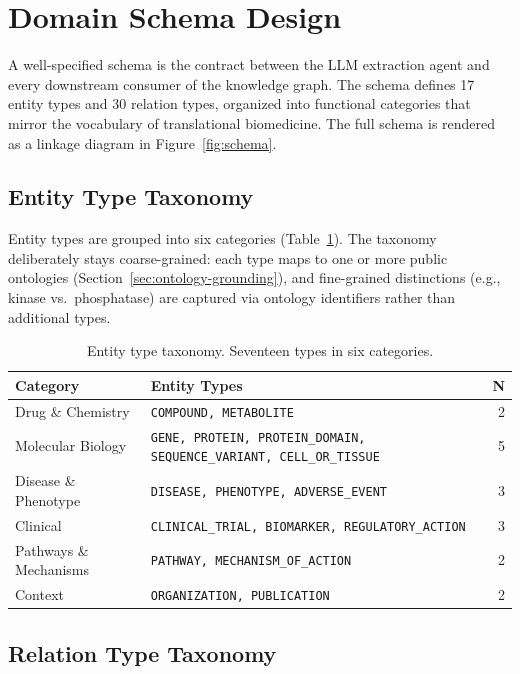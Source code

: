 \section{Domain Schema Design}
\label{sec:schema}

A well-specified schema is the contract between the LLM extraction agent and every downstream consumer of the knowledge graph.
The schema defines 17 entity types and 30 relation types, organized into functional categories that mirror the vocabulary of translational biomedicine.
The full schema is rendered as a linkage diagram in Figure~\ref{fig:schema}.

\subsection{Entity Type Taxonomy}

Entity types are grouped into six categories (Table~\ref{tab:entity-types}).
The taxonomy deliberately stays coarse-grained: each type maps to one or more
public ontologies (Section~\ref{sec:ontology-grounding}), and fine-grained
distinctions (e.g., kinase vs.\ phosphatase) are captured via ontology
identifiers rather than additional types.

\begin{table}[t]
\centering
\small
\caption{Entity type taxonomy. Seventeen types in six categories.}
\label{tab:entity-types}
\begin{tabular}{@{}lp{5.5cm}r@{}}
\toprule
\textbf{Category} & \textbf{Entity Types} & \textbf{N} \\
\midrule
Drug \& Chemistry      & \texttt{COMPOUND, METABOLITE}  & 2 \\
Molecular Biology      & \texttt{GENE, PROTEIN, PROTEIN\_DOMAIN, SEQUENCE\_VARIANT, CELL\_OR\_TISSUE} & 5 \\
Disease \& Phenotype   & \texttt{DISEASE, PHENOTYPE, ADVERSE\_EVENT}  & 3 \\
Clinical               & \texttt{CLINICAL\_TRIAL, BIOMARKER, REGULATORY\_ACTION}  & 3 \\
Pathways \& Mechanisms & \texttt{PATHWAY, MECHANISM\_OF\_ACTION}  & 2 \\
Context                & \texttt{ORGANIZATION, PUBLICATION}  & 2 \\
\bottomrule
\end{tabular}
\end{table}

\subsection{Relation Type Taxonomy}

